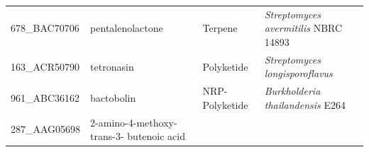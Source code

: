 \documentclass[12pt,twoside]{reedthesis}
\begin{document}
\begin{longtable}[]{@{}llll@{}}
\begin{minipage}[t]{0.19\columnwidth}
  678\_BAC70706\strut
  \end{minipage} & \begin{minipage}[t]{0.20\columnwidth}\raggedright\strut
  pentalenolactone\strut
  \end{minipage} & \begin{minipage}[t]{0.15\columnwidth}\raggedright\strut
  Terpene\strut
  \end{minipage} & \begin{minipage}[t]{0.34\columnwidth}\raggedright\strut
  \emph{Streptomyces avermitilis} NBRC 14893\strut
  \end{minipage}\tabularnewline
  \begin{minipage}[t]{0.19\columnwidth}\raggedright\strut
  163\_ACR50790\strut
  \end{minipage} & \begin{minipage}[t]{0.20\columnwidth}\raggedright\strut
  tetronasin\strut
  \end{minipage} & \begin{minipage}[t]{0.15\columnwidth}\raggedright\strut
  Polyketide\strut
  \end{minipage} & \begin{minipage}[t]{0.34\columnwidth}\raggedright\strut
  \emph{Streptomyces longisporoflavus}\strut
  \end{minipage}\tabularnewline
  \begin{minipage}[t]{0.19\columnwidth}\raggedright\strut
  961\_ABC36162\strut
  \end{minipage} & \begin{minipage}[t]{0.20\columnwidth}\raggedright\strut
  bactobolin\strut
  \end{minipage} & \begin{minipage}[t]{0.15\columnwidth}\raggedright\strut
  NRP-Polyketide\strut
  \end{minipage} & \begin{minipage}[t]{0.34\columnwidth}\raggedright\strut
  \emph{Burkholderia thailandensis} E264\strut
  \end{minipage}\tabularnewline
  \begin{minipage}[t]{0.19\columnwidth}\raggedright\strut
  287\_AAG05698\strut
  \end{minipage} & \begin{minipage}[t]{0.20\columnwidth}\raggedright\strut
  2-amino-4-methoxy- trans-3- butenoic acid\strut
  \end{minipage} & \begin{minipage}[t]{0.15\columnwidth}\raggedright\strut

\end{minipage}
\end{longtable}
\end{document}

